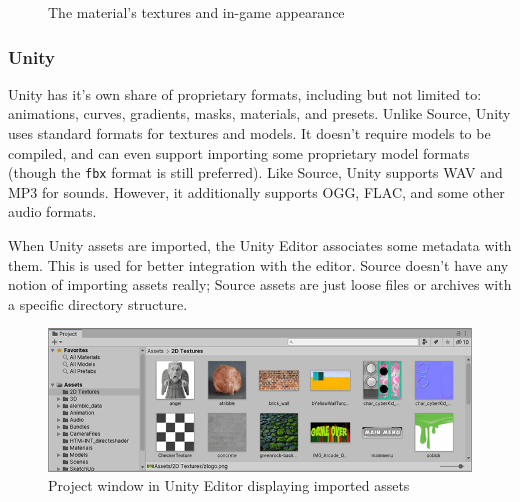 \documentclass[a4paper, 12pt]{scrartcl}
\begin{document}
\begin{figure}[!ht]
  \centering
  \qquad
  \caption{The material's textures and in-game appearance}
  \label{fig:source_texture}
\end{figure}

\subsubsection{Unity}
Unity has it's own share of proprietary formats, including but not limited to: animations, curves, gradients, masks, materials, and presets. Unlike Source, Unity uses standard formats for textures and models. It doesn't require models to be compiled, and can even support importing some proprietary model formats (though the \texttt{fbx} format is still preferred). Like Source, Unity supports WAV and MP3 for sounds. However, it additionally supports OGG, FLAC, and some other audio formats.

When Unity assets are imported, the Unity Editor associates some metadata with them. This is used for better integration with the editor. Source doesn't have any notion of importing assets really; Source assets are just loose files or archives with a specific directory structure.

\begin{figure}[!ht]
  \centering
  \includegraphics[width=0.75\linewidth]{images/unity_project_window.png}
  \caption{Project window in Unity Editor displaying imported assets}
  \label{fig:unity_project_window}
\end{figure}
\end{document}
